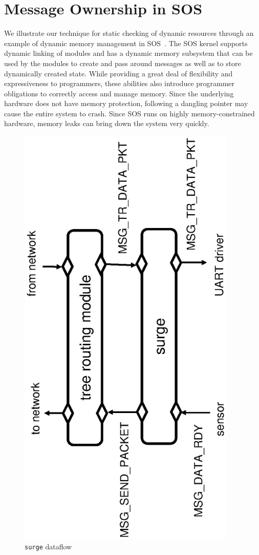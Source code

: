 \section{Message Ownership in SOS}
\label{sec:example}

We illustrate our technique for static checking of dynamic
resources through an example of dynamic memory
management in SOS~\cite{sos}.
The SOS kernel supports dynamic linking of modules and has a dynamic memory
subsystem that can be used by the modules to create and pass around messages
as well as to store dynamically created state.
While providing a great deal of flexibility and expressiveness to
programmers, these abilities also
introduce programmer obligations to correctly access and manage memory.
Since the underlying hardware
does not have memory protection, following a dangling pointer
may cause the entire system to crash.
Since SOS runs on highly memory-constrained hardware, memory leaks can
bring down the system very quickly.

\begin{figure}[t]
\centering\includegraphics[angle=270,width=4.1in]{surge}
\caption{{\tt surge} dataflow\label{fig:surge-dataflow}}
\end{figure}


